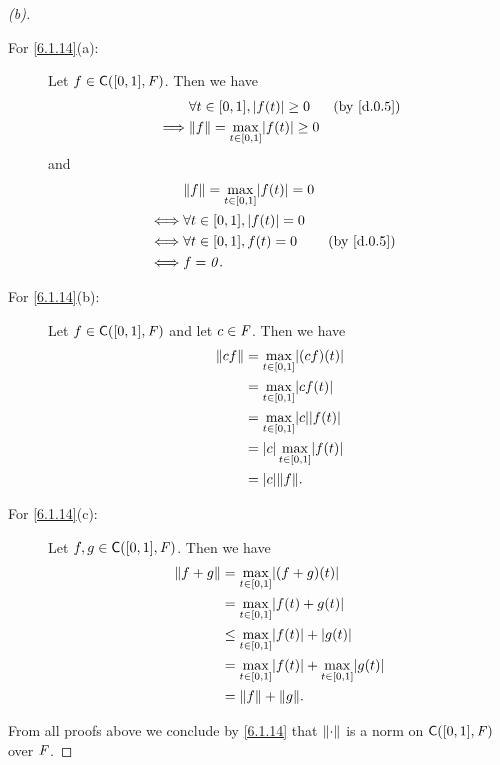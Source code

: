 \begin{proof}[(b)]
	\begin{description}
		\item[For \cref{6.1.14}(a):]
			Let \(f \in \cfs([0, 1], \F)\).
			Then we have
			\begin{align*}
				         & \forall t \in [0, 1], \abs{f(t)} \geq 0          &  & \by{d.0.5} \\
				\implies & \norm{f} = \max_{t \in [0, 1]} \abs{f(t)} \geq 0
			\end{align*}
			and
			\begin{align*}
				     & \norm{f} = \max_{t \in [0, 1]} \abs{f(t)} = 0                 \\
				\iff & \forall t \in [0, 1], \abs{f(t)} = 0                          \\
				\iff & \forall t \in [0, 1], f(t) = 0                &  & \by{d.0.5} \\
				\iff & f = \zv.
			\end{align*}
		\item[For \cref{6.1.14}(b):]
			Let \(f \in \cfs([0, 1], \F)\) and let \(c \in \mathit{F}\).
			Then we have
			\begin{align*}
				\norm{cf} & = \max_{t \in [0, 1]} \abs{(cf)(t)}      \\
				          & = \max_{t \in [0, 1]} \abs{cf(t)}        \\
				          & = \max_{t \in [0, 1]} \abs{c} \abs{f(t)} \\
				          & = \abs{c} \max_{t \in [0, 1]} \abs{f(t)} \\
				          & = \abs{c} \norm{f}.
			\end{align*}
		\item[For \cref{6.1.14}(c):]
			Let \(f, g \in \cfs([0, 1], \F)\).
			Then we have
			\begin{align*}
				\norm{f + g} & = \max_{t \in [0, 1]} \abs{(f + g)(t)}                            \\
				             & = \max_{t \in [0, 1]} \abs{f(t) + g(t)}                           \\
				             & \leq \max_{t \in [0, 1]} \abs{f(t)} + \abs{g(t)}                  \\
				             & = \max_{t \in [0, 1]} \abs{f(t)} + \max_{t \in [0, 1]} \abs{g(t)} \\
				             & = \norm{f} + \norm{g}.
			\end{align*}
	\end{description}
	From all proofs above we conclude by \cref{6.1.14} that \(\left\lVert\cdot\right\rVert\) is a norm on \(\cfs([0, 1], \F)\) over \(\mathit{F}\).
\end{proof}

